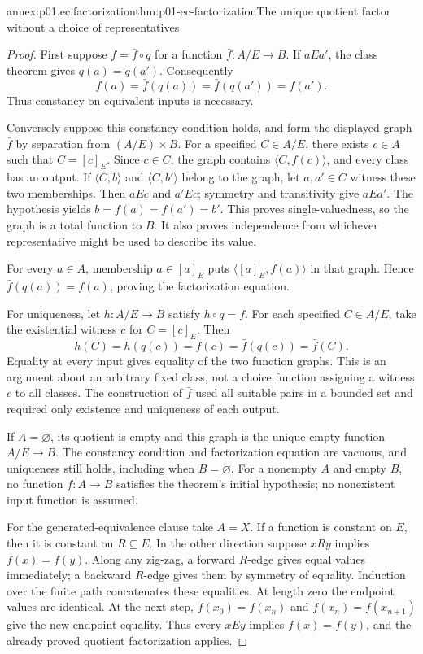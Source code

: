 \begin{annexitem}{annex:p01.ec.factorization}{thm:p01-ec-factorization}{The unique quotient factor without a choice of representatives}
\begin{proof}
First suppose \(f=\bar f\circ q\) for a function
\(\bar f:A/E\to B\). If \(aEa'\), the class theorem gives
\(q(a)=q(a')\). Consequently
\[
 f(a)=\bar f(q(a))=\bar f(q(a'))=f(a').
\]
Thus constancy on equivalent inputs is necessary.

Conversely suppose this constancy condition holds, and form the
displayed graph \(\bar f\) by separation from \((A/E)\times B\).
For a specified \(C\in A/E\), there exists \(c\in A\) such
that \(C=[c]_E\). Since \(c\in C\), the graph contains
\(\langle C,f(c)\rangle\), and every class has an output.
If \(\langle C,b\rangle\) and \(\langle C,b'\rangle\)
belong to the graph, let \(a,a'\in C\) witness these two
memberships. Then \(aEc\) and \(a'Ec\); symmetry and transitivity
give \(aEa'\). The hypothesis yields
\(b=f(a)=f(a')=b'\). This proves single-valuedness, so the graph
is a total function to \(B\). It also proves independence from
whichever representative might be used to describe its value.

For every \(a\in A\), membership \(a\in[a]_E\) puts
\(\langle[a]_E,f(a)\rangle\) in that graph. Hence
\(\bar f(q(a))=f(a)\), proving the factorization equation.

For uniqueness, let \(h:A/E\to B\) satisfy \(h\circ q=f\).
For each specified \(C\in A/E\), take the existential witness
\(c\) for \(C=[c]_E\). Then
\[
 h(C)=h(q(c))=f(c)=\bar f(q(c))=\bar f(C).
\]
Equality at every input gives equality of the two function graphs.
This is an argument about an arbitrary fixed class, not a choice
function assigning a witness \(c\) to all classes. The construction
of \(\bar f\) used all suitable pairs in a bounded set and required
only existence and uniqueness of each output.

If \(A=\varnothing\), its quotient is empty and this graph is
the unique empty function \(A/E\to B\). The constancy condition
and factorization equation are vacuous, and uniqueness still holds,
including when \(B=\varnothing\). For a nonempty \(A\) and empty
\(B\), no function \(f:A\to B\) satisfies the theorem's initial
hypothesis; no nonexistent input function is assumed.

For the generated-equivalence clause take \(A=X\). If a function
is constant on \(E\), then it is constant on \(R\subseteq E\).
In the other direction suppose \(xRy\) implies \(f(x)=f(y)\).
Along any zig-zag, a forward \(R\)-edge gives equal values
immediately; a backward \(R\)-edge gives them by symmetry of
equality. Induction over the finite path concatenates these equalities.
At length zero the endpoint values are identical. At the next step,
\(f(x_0)=f(x_n)\) and \(f(x_n)=f(x_{n+1})\) give the new
endpoint equality. Thus every \(xEy\) implies \(f(x)=f(y)\),
and the already proved quotient factorization applies.
\end{proof}
\end{annexitem}

